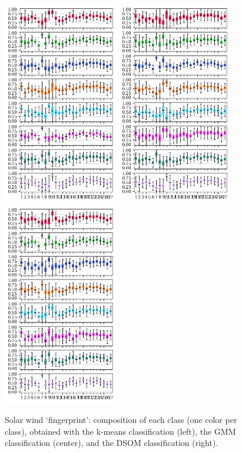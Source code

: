 \documentclass[utf8]{frontiersSCNS} %
\begin{document}
\begin{figure}[h!]
	\begin{center}
		\includegraphics[width=5cm]{Amaya/classesdatarange-kmeans}\hfill
		\includegraphics[width=5cm]{Amaya/classesdatarange-gmm}\hfill
		\includegraphics[width=5cm]{Amaya/classesdatarange-som}
	\end{center}
	\caption{Solar wind `fingerprint': composition of each class (one color per class), obtained with the k-means classification (left), the GMM classification (center), and the DSOM classification (right).}\label{fig:classesdatarange}
\end{figure}
\end{document}
